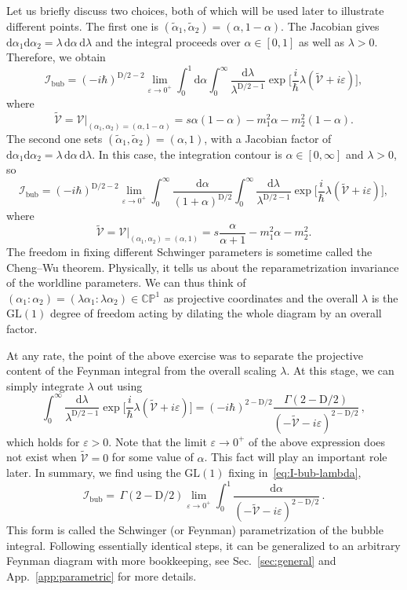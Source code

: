 \documentclass[12pt]{article}
\numberwithin{figure}{section}
\def \be {\begin{equation}}
\def \ee {\end{equation}}
\def \CP {\mathbb{CP}}
\def \D {\mathrm{D}}
\def \d {\mathrm{d}}
\def \eps {\varepsilon}
\def \V {\mathcal{V}}
\def \I {\mathcal{I}}
\def \GL {\mathrm{GL}}
\def \bubble {\mathrm{bub}}
\begin{document}
	Let us briefly discuss two choices, both of which will be used later to illustrate different points. 
	The first one is $(\tilde{\alpha}_1, \tilde{\alpha}_2) = (\alpha, 1 {-} \alpha)$.
	The Jacobian gives $\d\alpha_1 \d\alpha_2 = \lambda\, \d\alpha\, \d\lambda$ and the integral proceeds over $\alpha \in [0,1]$ as well as $\lambda > 0$. Therefore, we obtain
	\be
	\label{eq:I-bub-lambda}
	\I_\bubble = \left(-i \hbar \right)^{\D/2-2} \lim_{\eps \to 0^+} \int_0^1 \d\alpha \int_0^{\infty} \frac{\d\lambda}{\lambda^{\D/2-1}}\exp \bigg[ \frac{i}{\hbar} \lambda \left( \tilde{\V} + i\eps\right) \bigg],
	\ee
	where
	\be\label{eq:V-tilde}
	\tilde{\V} = \V\big|_{(\alpha_1,\alpha_2) = (\alpha, 1-\alpha)} = s \alpha (1-\alpha) - m_1^2 \alpha - m_2^2 (1-\alpha).
	\ee
	The second one sets $(\tilde{\alpha}_1, \tilde{\alpha}_2) = (\alpha, 1)$, with a Jacobian factor of $\d\alpha_1 \d\alpha_2 = \lambda\, \d\alpha\, \d\lambda$. In this case, the integration contour is $\alpha \in [0,\infty]$ and $\lambda>0$, so
	\be
	\label{eq:I-bub-lambda2}
	\I_\bubble = \left(-i \hbar \right)^{\D/2-2} \lim_{\eps \to 0^+} \int_0^\infty \frac{\d\alpha}{(1+\alpha)^{\D/2}} \int_0^{\infty} \frac{\d\lambda}{\lambda^{\D/2-1}}\exp \bigg[ \frac{i}{\hbar} \lambda \left( \tilde{\V} + i\eps\right) \bigg],
	\ee
	where
	\be\label{eq:V-tilde2}
	\tilde{\V} = \V\big|_{(\alpha_1,\alpha_2) = (\alpha, 1)} = s \frac{\alpha}{\alpha+1} - m_1^2 \alpha - m_2^2.
	\ee
	The freedom in fixing different Schwinger parameters is sometime called the Cheng--Wu theorem. Physically, it tells us about the reparametrization invariance of the worldline parameters. We can thus think of $(\alpha_1:\alpha_2) = (\lambda \alpha_1 : \lambda \alpha_2) \in \CP^1$ as projective coordinates and the overall $\lambda$ is the $\GL(1)$ degree of freedom acting by dilating the whole diagram by an overall factor.
	
	At any rate, the point of the above exercise was to separate the projective content of the Feynman integral from the overall scaling $\lambda$. At this stage, we can simply integrate $\lambda$ out using
	\be
	\int_0^{\infty} \frac{\d\lambda}{\lambda^{\D/2-1}}\exp \bigg[ \frac{i}{\hbar} \lambda \left( \tilde{\V} + i\eps\right) \bigg] = \left( - i \hbar \right)^{2-\D/2} \frac{\Gamma(2 {-} \D/2)}{(-\tilde{\V} - i\eps)^{2 - \D/2}} \,,
	\ee
	which holds for $\eps>0$.
	Note that the limit $\eps \to 0^+$ of the above expression does not exist when $\tilde{\V} = 0$ for some value of $\alpha$. This fact will play an important role later. In summary, we find using the $\GL(1)$ fixing in~\eqref{eq:I-bub-lambda},
	\be\label{eq:I-bubble}
	\I_\bubble =  \,  \Gamma(2{-}\D/2) \lim_{\eps \to 0^+} \int_{0}^{1} \frac{\d\alpha}{( -\tilde{\V} - i\eps)^{2-\D/2}} \,.
	\ee
	This form is called the Schwinger (or Feynman) parametrization of the bubble integral. Following essentially identical steps, it can be generalized to an arbitrary Feynman diagram with more bookkeeping, see Sec.~\ref{sec:general} and App.~\ref{app:parametric} for more details.
	
\end{document}
